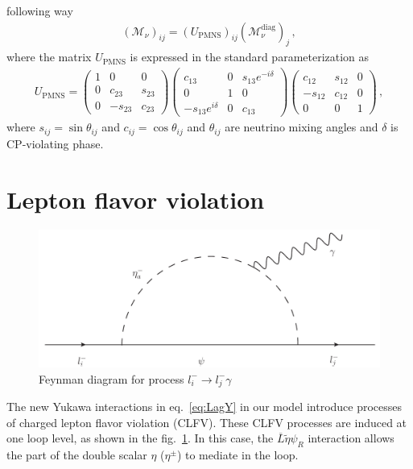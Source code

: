\documentclass[12pt]{article}
\begin{document}
following way
\begin{align}
(\mathcal{M}_{\nu})_{ij} = (U_{\text{PMNS}})_{ij} (\mathcal{M}_{\nu}^{\text{diag}})_{j}\,,
\end{align}
where the matrix $U_{\text{PMNS}}$ is expressed in the standard parameterization as
\begin{align*}
U_{\text{PMNS}} = \begin{pmatrix}
    1 & 0		& 0 \\
    0 & c_{23}  & s_{23} \\
    0 & -s_{23} & c_{23}
\end{pmatrix}
\begin{pmatrix}
    c_{13}  &  0 & s_{13}e^{-i\delta} \\
    0 		&  1 & 0 \\
    -s_{13}e^{i\delta} &  0 & c_{13}
\end{pmatrix}
\begin{pmatrix}
    c_{12}  & s_{12} & 0 \\
    -s_{12} & c_{12} & 0 \\
    0		& 0		 & 1
\end{pmatrix}\,,
\end{align*}
where $s_{ij} = \sin \theta_{ij}$ and $c_{ij} = \cos \theta_{ij}$ and $\theta_{ij}$ are neutrino mixing angles and $\delta$ is CP-violating phase.

\section{Lepton flavor violation}
\label{sec:LFV}
%
\begin{figure}
\centering
\includegraphics[scale=0.6]{LFV.pdf}
\caption{Feynman diagram for process $l^{-}_{i} \to l^{-}_{j} \gamma$}
\label{fig:LFV}
\end{figure}
%
The new Yukawa interactions in eq.~\eqref{eq:LagY} in our model introduce processes of charged lepton flavor violation (CLFV). These CLFV processes are induced at one loop level, as shown in the fig.~\ref{fig:LFV}. In this case, the $\overline{L} \tilde{\eta} \psi_R$ interaction allows the part of the double scalar $\eta$ ($\eta^{\pm}$) to mediate in the loop.
\end{document}
